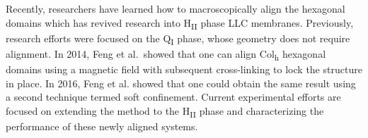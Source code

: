 \documentclass[journal=jpcbfk,manuscript=article]{achemso}
\begin{document}


  Recently, researchers have learned how to macroscopically align the hexagonal
  domains which has revived research into H\textsubscript{II} phase LLC membranes.
  Previously, research efforts were focused on the Q\textsubscript{I} phase,
  whose geometry does not require alignment. In 2014, Feng et al.~showed that one
  can align Col\textsubscript{h} hexagonal domains using a magnetic field with
  subsequent cross-linking to lock the structure in place\cite{feng_scalable_2014}.
  In 2016, Feng et al. showed that one could obtain the same result using a second
  technique termed soft confinement\cite{feng_thin_2016}. Current experimental 
  efforts are focused on extending the method to the H\textsubscript{II} phase 
  and characterizing the performance of these newly aligned systems.
\end{document}
